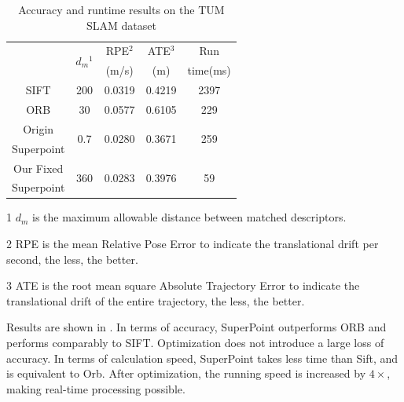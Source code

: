 \begin{table}[t]
  \centering
  \caption{ Accuracy and runtime results on the TUM\cite{sturm12iros} SLAM dataset  }
  \footnotesize
  \begin{threeparttable}
\begin{tabular}{|c|c|c|c|c|} 
  \hline
        & \multirow{2}[2]{*}{$d_m$$^1$} & RPE$^2$ & ATE$^3$  & Run  \bigstrut[t]\\
        &       &  (m/s) & (m) & time(ms) \bigstrut[b]\\
  \hline
  SIFT  & 200   & 0.0319  & 0.4219 & 2397  \bigstrut\\
  \hline
  ORB   & 30    & 0.0577  & 0.6105 & 229  \bigstrut\\
  \hline
  Origin & \multirow{2}[2]{*}{0.7} & \multirow{2}[2]{*}{0.0280} & \multirow{2}[2]{*}{0.3671} & \multirow{2}[2]{*}{259} \bigstrut[t]\\
   Superpoint &       &       &       &  \bigstrut[b]\\
  \hline
  Our Fixed & \multirow{2}[2]{*}{360} & \multirow{2}[2]{*}{0.0283} & \multirow{2}[2]{*}{0.3976} & \multirow{2}[2]{*}{59} \bigstrut[t]\\
   Superpoint &       &       &       &  \bigstrut[b]\\
  \hline
  \end{tabular}%
  

\begin{tablenotes}
  \item[1] $d_m$ is the maximum allowable distance between matched descriptors.  
  \item[2] RPE is the mean Relative Pose Error to indicate the translational drift per second, the less, the better.
  \item[3] ATE is the root mean square Absolute Trajectory Error to indicate the translational drift of the entire trajectory, the less, the better.
\end{tablenotes}
    \end{threeparttable}
  \label{tab:VO}%
\end{table}%

Results are shown in . In terms of accuracy, SuperPoint outperforms ORB and performs comparably to SIFT. Optimization does not introduce a large loss of accuracy. In terms of calculation speed, SuperPoint takes less time than Sift, and is equivalent to Orb. After optimization, the running speed is increased by $4\times$, making real-time processing possible.

